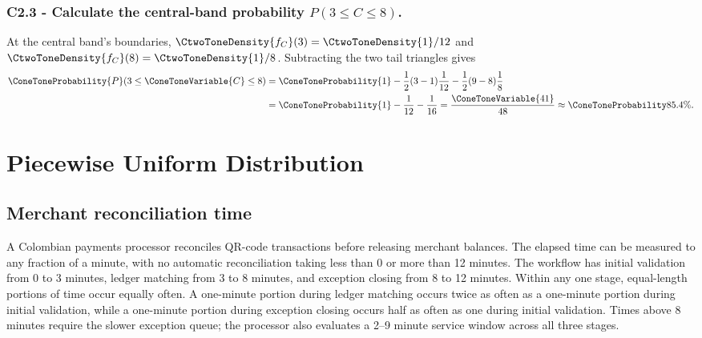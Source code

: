\subsubsection*{C2.3 - Calculate the central-band probability
$P(3\le C\le8)$.}
\label{subsec:c2-triangular-clearance-c}
At the central band's boundaries, $\CtwoToneDensity{f_C}(3)=\CtwoToneDensity{1}/12$ and $\CtwoToneDensity{f_C}(8)=\CtwoToneDensity{1}/8$.
Subtracting the two tail triangles gives
\[
 \begin{aligned}
 \ConeToneProbability{P}(3\le \ConeToneVariable{C}\le8)
 &=\ConeToneProbability{1}-\frac12(3-1)\frac1{12}-\frac12(9-8)\frac18\\
 &=\ConeToneProbability{1}-\frac1{12}-\frac1{16}=\frac{\ConeToneVariable{41}}{48}\approx\ConeToneProbability{85.4\%}.
 \end{aligned}
\]

\section{Piecewise Uniform Distribution}\label{sec:c2-piecewise-uniform-practice}

\subsection{Merchant reconciliation time}\label{sec:c2-piecewise-uniform-reconciliation}
A Colombian payments processor reconciles QR-code transactions before
releasing merchant balances.  The elapsed time can be measured to any fraction
of a minute, with no automatic reconciliation taking less than 0 or more than
12 minutes.  The workflow has initial validation from 0 to 3 minutes, ledger
matching from 3 to 8 minutes, and exception closing from 8 to 12 minutes.
Within any one stage, equal-length portions of time occur equally often.  A
one-minute portion during ledger matching occurs twice as often as a one-minute
portion during initial validation, while a one-minute portion during exception
closing occurs half as often as one during initial validation.  Times above 8
minutes require the slower exception queue; the processor also evaluates a
2--9 minute service window across all three stages.

